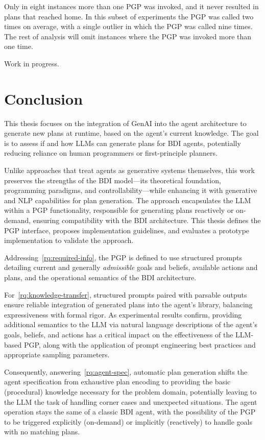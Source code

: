 \documentclass[12pt,a4paper,openright,twoside]{book}
\begin{document}
Only in eight instances more than one PGP was invoked, and it never resulted in plans that reached home.
%
In this subset of experiments the PGP was called two times on average, with a single outlier in which the PGP was called nine times.
%
The rest of analysis will omit instances where the PGP was invoked more than one time.

Work in progress.

\chapter{Conclusion}\label{chap:conclusion}

This thesis focuses on the integration of \ac{GenAI} into the \agentspeak{} agent architecture to generate new plans at runtime, based on the agent's current knowledge.
%
The goal is to assess if and how \acp{LLM} can generate plans for \ac{BDI} agents, potentially reducing reliance on human programmers or first-principle planners.

Unlike approaches that treat agents as generative systems themselves, this work preserves the strengths of the \ac{BDI} model---its theoretical foundation, programming paradigms, and controllability---while enhancing it with generative and \ac{NLP} capabilities for plan generation.
%
The approach encapsulates the \ac{LLM} within a \ac{PGP} functionality, responsible for generating plans reactively or on-demand, ensuring compatibility with the \ac{BDI} architecture.
%
This thesis defines the \ac{PGP} interface, proposes implementation guidelines, and evaluates a prototype implementation to validate the approach.

Addressing~\cref{rq:required-info}, the \ac{PGP} is defined to use structured prompts detailing current and generally \emph{admissible} goals and beliefs, available actions and plans, and the operational semantics of the \ac{BDI} architecture.

For~\cref{rq:knowledge-transfer}, structured prompts paired with parsable outputs ensure reliable integration of generated plans into the agent's library, balancing expressiveness with formal rigor.
%
As experimental results confirm, providing additional semantics to the \ac{LLM} via natural language descriptions of the agent's goals, beliefs, and actions has a critical impact on the effectiveness of the LLM-based PGP, along with the application of prompt engineering best practices and appropriate sampling parameters.

Consequently, answering~\cref{rq:agent-spec}, automatic plan generation shifts the agent specification from exhaustive plan encoding to providing the basic (procedural) knowledge necessary for the problem domain, potentially leaving to the \ac{LLM} the task of handling corner cases and unexpected situations.
%
The agent operation stays the same of a classic \ac{BDI} agent, with the possibility of the \ac{PGP} to be triggered explicitly (on-demand) or implicitly (reactively) to handle goals with no matching plans.
\end{document}
